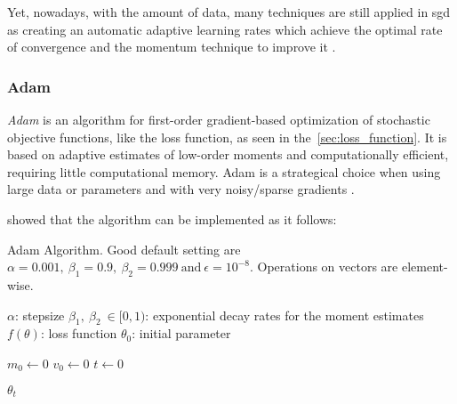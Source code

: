 Yet, nowadays, with the amount of data, many techniques are still applied in \gls*{sgd} as creating an automatic adaptive learning rates which achieve the optimal rate of convergence \citep{darken1991} and the momentum technique to improve it \citep{sutskever2013}.

\subsubsection*{Adam}

\emph{Adam} is an algorithm for first-order gradient-based optimization of stochastic objective functions, like the loss function, as seen in the~\cref{sec:loss_function}.
It is based on adaptive estimates of low-order moments and computationally efficient, requiring little computational memory.
Adam is a strategical choice when using large data or parameters and with very noisy/sparse gradients \citep{kingma2017}.

\citet{kingma2017} showed that the algorithm can be implemented as it follows:

\begin{algorithm}[!htb]
\caption[Adam Algorithm]{Adam Algorithm. Good default setting are \(\alpha = 0.001,\ \beta_1 = 0.9,\ \beta_2 = 0.999\ \text{and}\ \epsilon = 10^{-8}\). Operations on vectors are element-wise.}
\begin{algorithmic}
\Require \(\alpha\): stepsize
\Require \(\beta_1,\ \beta_2\ \in [0,1)\): exponential decay rates for the moment estimates
\Require \(f(\theta)\): loss function
\Require \(\theta_0\): initial parameter

\State \(m_0 \gets 0\)
\State \(v_0 \gets 0\)
\State \(t \gets 0\)
\EndWhile

\Return \(\theta_t\)
\end{algorithmic}
\end{algorithm}